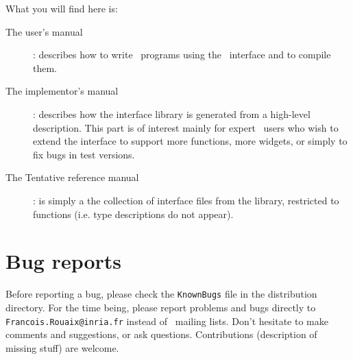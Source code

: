 What you will find here is:
\begin{description}
\item[The user's manual] : describes how to write \caml\ programs using the
\tk\ interface and to compile them. 
\item[The implementor's manual] : describes how the interface library is
generated from a high-level description. This part is of interest mainly for
expert \tk\ users who wish to extend the interface to support more
functions, more widgets, or simply to fix bugs in test versions.
\item[The Tentative reference manual] : is simply a the collection of
interface files from the library, restricted to functions (i.e. type
descriptions do not appear). 
\end{description}

\section*{Bug reports}
Before reporting a bug, please check the \verb|KnownBugs| file in the
distribution directory.
For the time being, please report problems and bugs directly to
\verb|Francois.Rouaix@inria.fr| instead of \caml\ mailing lists.
Don't hesitate to make comments and suggestions, or ask questions.
Contributions (description of missing stuff) are welcome.

\tableofcontents





\appendix



